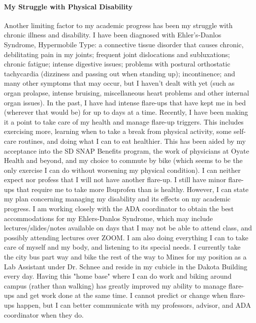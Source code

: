 \documentclass[12pt]{article}
\begin{document}
\paragraph{My Struggle with Physical Disability}
Another limiting factor to my academic progress has been my struggle with chronic
illness and disability.
I have been diagnosed with Ehler's-Danlos Syndrome, Hypermobile Type:
a connective tissue disorder that causes chronic, debilitating pain in my joints;
frequent joint dislocations and subluxations; chronic fatigue; intense digestive issues;
problems with postural orthostatic tachycardia (dizziness and passing out when standing up);
incontinence; and many other symptoms that may occur, but I haven't dealt 
with yet (such as organ prolapse, intense bruising, miscellaneous heart problems 
and other internal organ issues).
In the past, I have had intense flare-ups that have kept me in bed (wherever that would be)
for up to days at a time. 
Recently, I have been making it a point to take care of my health and manage flare-up triggers. 
This includes exercising more, learning when to take a break from physical activity, 
some self-care routines, and doing what I can to eat healthier.
This has been aided by my acceptance into the SD SNAP Benefits program, the work 
of physicians at Oyate Health and beyond, and my choice to commute by bike (which 
seems to be the only exercise I can do without worsening my physical condition).
I can neither expect nor profess that I will not have another flare-up. 
I still have minor flare-ups that require me to take more Ibuprofen than is healthy.
However, I can state my plan concerning managing my disability and its effects on my academic progress.
I am working closely with the ADA coordinator to obtain the best accommodations
for my Ehlers-Danlos Syndrome, which may include lectures/slides/notes available
on days that I may not be able to attend class, and possibly attending lectures 
over ZOOM.
I am also doing everything I can to take care of myself and my body, and listening to its special needs.
I currently take the city bus part way and bike the rest of the way to Mines for 
my position as a Lab Assistant under Dr. Schnee and reside in my cubicle in the 
Dakota Building every day. 
Having this "home base" where I can do work and biking around campus (rather than walking)
has greatly improved my ability to manage flare-ups and get work done at the same time.
I cannot predict or change when flare-ups happen, but I can better communicate 
with my professors, advisor, and ADA coordinator when they do.
\end{document}
